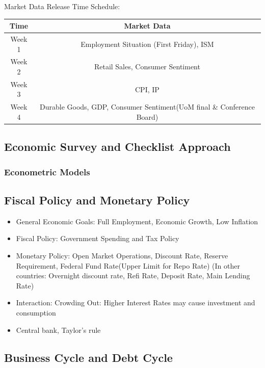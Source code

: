 \documentclass[11pt, openany]{book}              %
\begin{document}
Market Data Release Time Schedule:

\begin{center}
 \begin{tabular}{||c c||} 
 \hline
 Time & Market Data \\ [0.5ex] 
 \hline
 Week 1 & Employment Situation (First Friday), ISM \\ 
 Week 2 & Retail Sales, Consumer Sentiment \\ 
 Week 3 & CPI, IP \\ 
 Week 4 & Durable Goods, GDP, Consumer Sentiment(UoM final \& Conference Board) \\ 
 \hline
\end{tabular}
\end{center}

\subsection{Economic Survey and Checklist Approach}


\subsubsection{Econometric Models}

\subsection{Fiscal Policy and Monetary Policy}

\begin{itemize}
	\item General Economic Goals: Full Employment, Economic Growth, Low Inflation
	\item Fiscal Policy: Government Spending and Tax Policy
    \item Monetary Policy: Open Market Operations, Discount Rate, Reserve Requirement, Federal Fund Rate(Upper Limit for Repo Rate) (In other countries: Overnight discount rate, Refi Rate, Deposit Rate, Main Lending Rate) 
    \item Interaction: Crowding Out: Higher Interest Rates may cause investment and consumption 
    \item Central bank, Taylor's rule
\end{itemize}

\subsection{Business Cycle and Debt Cycle}
\end{document}
